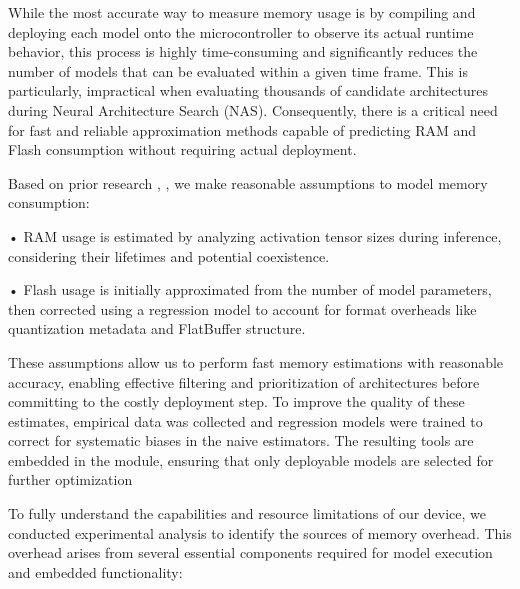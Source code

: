 While the most accurate way to measure memory usage is by compiling and deploying each model onto the microcontroller to observe its actual runtime behavior, this process is highly time-consuming and significantly reduces the number of models that can be evaluated within a given time frame. This is particularly, impractical when evaluating thousands of candidate architectures during Neural Architecture Search (NAS). Consequently, there is a critical need for fast and reliable approximation methods capable of predicting RAM and Flash consumption without requiring actual deployment.


Based on prior research \cite{tensorflow_RamEstimation}, \cite{liberis2019neural} , we make reasonable assumptions to model
memory consumption:

• RAM usage is estimated by analyzing activation tensor sizes during inference, considering their lifetimes and potential coexistence.

• Flash usage is initially approximated from the number of model parameters, then
corrected using a regression model to account for format overheads like quantization
metadata and FlatBuffer structure.

These assumptions allow us to perform fast memory estimations with reasonable accuracy, enabling effective filtering and prioritization of architectures before committing to
the costly deployment step. To improve the quality of these estimates, empirical data
was collected and regression models were trained to correct for systematic biases in the naive estimators. The resulting tools are embedded in the module, ensuring that only
deployable models are selected for further optimization

To fully understand the capabilities and resource limitations of our device, we conducted experimental analysis to identify the sources of memory overhead. This overhead arises from several essential components required for model execution and embedded functionality:

